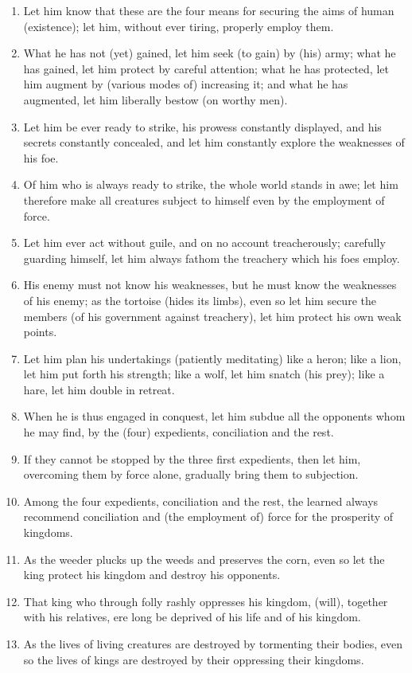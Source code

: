 \begin{enumerate}
\item Let him know that these are the four means for securing the aims of human (existence); let him, without ever tiring, properly employ them.
\item What he has not (yet) gained, let him seek (to gain) by (his) army; what he has gained, let him protect by careful attention; what he has protected, let him augment by (various modes of) increasing it; and what he has augmented, let him liberally bestow (on worthy men).
\item Let him be ever ready to strike, his prowess constantly displayed, and his secrets constantly concealed, and let him constantly explore the weaknesses of his foe.
\item Of him who is always ready to strike, the whole world stands in awe; let him therefore make all creatures subject to himself even by the employment of force.
\item Let him ever act without guile, and on no account treacherously; carefully guarding himself, let him always fathom the treachery which his foes employ.
\item His enemy must not know his weaknesses, but he must know the weaknesses of his enemy; as the tortoise (hides its limbs), even so let him secure the members (of his government against treachery), let him protect his own weak points.
\item Let him plan his undertakings (patiently meditating) like a heron; like a lion, let him put forth his strength; like a wolf, let him snatch (his prey); like a hare, let him double in retreat.
\item When he is thus engaged in conquest, let him subdue all the opponents whom he may find, by the (four) expedients, conciliation and the rest.
\item If they cannot be stopped by the three first expedients, then let him, overcoming them by force alone, gradually bring them to subjection.
\item Among the four expedients, conciliation and the rest, the learned always recommend conciliation and (the employment of) force for the prosperity of kingdoms.
\item As the weeder plucks up the weeds and preserves the corn, even so let the king protect his kingdom and destroy his opponents.
\item That king who through folly rashly oppresses his kingdom, (will), together with his relatives, ere long be deprived of his life and of his kingdom.
\item As the lives of living creatures are destroyed by tormenting their bodies, even so the lives of kings are destroyed by their oppressing their kingdoms.

\end{enumerate}
